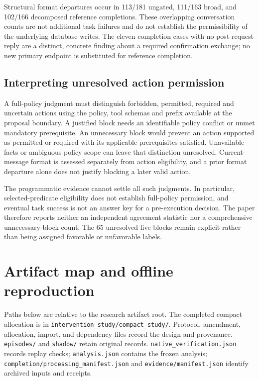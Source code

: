 Structural format departures occur in 113/181 ungated, 111/163 broad,
and 102/166 decomposed reference completions. These overlapping
conversation counts are not additional task failures and do not
establish the permissibility of the underlying database writes. The
eleven completion cases with no post-request reply are a distinct,
concrete finding about a required confirmation exchange; no new primary
endpoint is substituted for reference completion.

\subsection{Interpreting unresolved action
permission}\label{interpreting-unresolved-action-permission}

A full-policy judgment must distinguish forbidden, permitted, required
and uncertain actions using the policy, tool schemas and prefix
available at the proposal boundary. A justified block needs an
identifiable policy conflict or unmet mandatory prerequisite. An
unnecessary block would prevent an action supported as permitted or
required with its applicable prerequisites satisfied. Unavailable facts
or ambiguous policy scope can leave that distinction unresolved.
Current-message format is assessed separately from action eligibility,
and a prior format departure alone does not justify blocking a later
valid action.

The programmatic evidence cannot settle all such judgments. In
particular, selected-predicate eligibility does not establish
full-policy permission, and eventual task success is not an answer key
for a pre-execution decision. The paper therefore reports neither an
independent agreement statistic nor a comprehensive unnecessary-block
count. The 65 unresolved live blocks remain explicit rather than being
assigned favorable or unfavorable labels.

\section{Artifact map and offline
reproduction}\label{artifact-map-and-offline-reproduction}

\label{app:combined-artifacts}

Paths below are relative to the research artifact root. The completed
compact allocation is in \texttt{intervention\_study/compact\_study/}.
Protocol, amendment, allocation, import, and dependency files record the
design and provenance. \texttt{episodes/} and \texttt{shadow/} retain
original records. \texttt{native\_verification.json} records replay
checks; \texttt{analysis.json} contains the frozen analysis;
\texttt{completion/processing\_manifest.json} and
\texttt{evidence/manifest.json} identify archived inputs and receipts.

